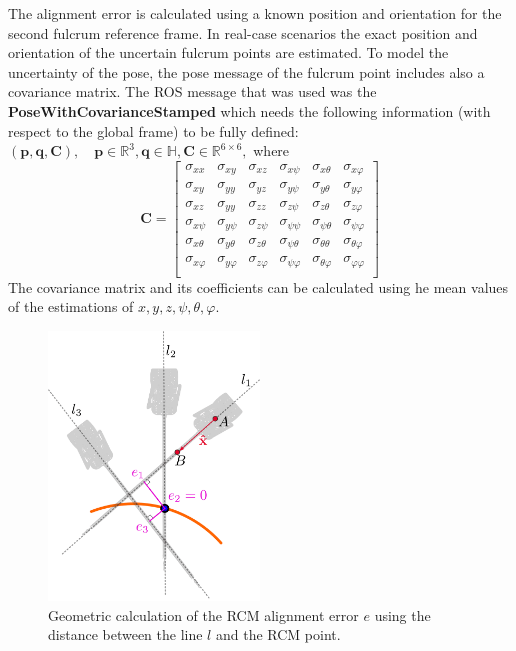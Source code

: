 The alignment error is calculated using a known position and orientation for the second fulcrum reference frame. In real-case scenarios the exact position and orientation of the uncertain fulcrum points are estimated. To model the uncertainty of the pose, the pose message of the fulcrum point includes also a covariance matrix. The ROS message that was used was the \textbf{PoseWithCovarianceStamped} which needs the 
following information (with respect to the global frame) to be fully defined:
$
( \mathbf{p}, \mathbf{q}, \mathbf{C} ), \quad \mathbf{p} \in \mathbb{R}^3, \mathbf{q} \in \mathbb{H}, \mathbf{C} \in \mathbb{R}^{6 \times 6},
$
where 
\begin{equation}
\mathbf{C} = \begin{bmatrix}
σ_{xx} & σ_{xy} & σ_{xz} & σ_{xψ} & σ_{xθ} & σ_{xφ} \\
σ_{xy} & σ_{yy} & σ_{yz} & σ_{yψ} & σ_{yθ} & σ_{yφ} \\
σ_{xz} & σ_{yy} & σ_{zz} & σ_{zψ} & σ_{zθ} & σ_{zφ} \\
σ_{xψ} & σ_{yψ} & σ_{zψ} & σ_{ψψ} & σ_{ψθ} & σ_{ψφ} \\
σ_{xθ} & σ_{yθ} & σ_{zθ} & σ_{ψθ} & σ_{θθ} & σ_{θφ} \\
σ_{xφ} & σ_{yφ} & σ_{zφ} & σ_{ψφ} & σ_{θφ} & σ_{φφ} \\
\end{bmatrix}
\end{equation}
The covariance matrix and its coefficients can be calculated using %
he mean values of the estimations of $x,y,z,ψ,θ,φ$.

\begin{center}
\begin{figure}[htbp]
\centering
\includegraphics[width=0.5\textwidth]{images/robot_planner6/rcm-error-geometry.png}
\caption{Geometric calculation of the RCM alignment error $e$ using the distance between the line $l$ and the RCM point.}
\label{rcm-error-geometry}
\end{figure}
\end{center}

